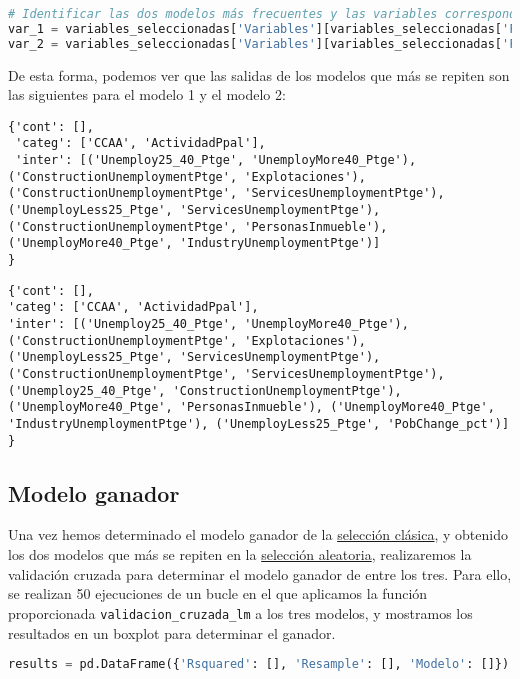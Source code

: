 \documentclass[a4paper,onecolumn]{extarticle}
\begin{document}
\begin{sloppypar}
\begin{lstlisting}[language=Python]
# Identificar las dos modelos más frecuentes y las variables correspondientes.
var_1 = variables_seleccionadas['Variables'][variables_seleccionadas['Formula'].index(frec_ordenada['Formula'][0])]
var_2 = variables_seleccionadas['Variables'][variables_seleccionadas['Formula'].index(frec_ordenada['Formula'][1])]
\end{lstlisting}

De esta forma, podemos ver que las salidas de los modelos que más se repiten son las siguientes para el modelo 1 y el modelo 2:
\begin{lstlisting}[numbers=none]
{'cont': [],
 'categ': ['CCAA', 'ActividadPpal'],
 'inter': [('Unemploy25_40_Ptge', 'UnemployMore40_Ptge'),  ('ConstructionUnemploymentPtge', 'Explotaciones'),  ('ConstructionUnemploymentPtge', 'ServicesUnemploymentPtge'), ('UnemployLess25_Ptge', 'ServicesUnemploymentPtge'),  ('ConstructionUnemploymentPtge', 'PersonasInmueble'),  ('UnemployMore40_Ptge', 'IndustryUnemploymentPtge')]
}
\end{lstlisting}
\begin{lstlisting}[numbers=none]
{'cont': [],
'categ': ['CCAA', 'ActividadPpal'],
'inter': [('Unemploy25_40_Ptge', 'UnemployMore40_Ptge'), ('ConstructionUnemploymentPtge', 'Explotaciones'), ('UnemployLess25_Ptge', 'ServicesUnemploymentPtge'), ('ConstructionUnemploymentPtge', 'ServicesUnemploymentPtge'), ('Unemploy25_40_Ptge', 'ConstructionUnemploymentPtge'), ('UnemployMore40_Ptge', 'PersonasInmueble'), ('UnemployMore40_Ptge', 'IndustryUnemploymentPtge'), ('UnemployLess25_Ptge', 'PobChange_pct')]
}
\end{lstlisting}


\subsection{Modelo ganador}\label{linganador}
Una vez hemos determinado el modelo ganador de la \hyperref[linclasica]{selección clásica}, y obtenido los dos modelos que más se repiten en la 
\hyperref[linaleatoria]{selección aleatoria}, realizaremos la validación cruzada para determinar el modelo ganador de entre los tres. Para ello, se realizan 
50 ejecuciones de un bucle en el que aplicamos la función proporcionada \texttt{validacion\_cruzada\_lm} a los tres modelos, y mostramos los resultados en un 
boxplot para determinar el ganador.

\begin{lstlisting}[language=Python]
results = pd.DataFrame({'Rsquared': [], 'Resample': [], 'Modelo': []})


\end{lstlisting}
\end{sloppypar}
\end{document}
